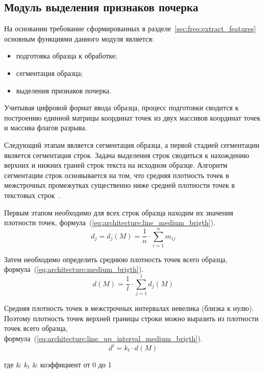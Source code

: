 \subsection{Модуль выделения признаков почерка}
На основании требование сформированных в разделе~\ref{sec:freq:extract_features} основным функциями данного модуля является:
\begin{itemize}
  \item подготовка образца к обработке;
  \item сегментация образца;
  \item выделения признаков почерка.
\end{itemize}

Учитывая цифровой формат ввода образца, процесс подготовки сводится к построению единной матрицы координат точек из двух массивов координат точек и массива флагов разрыва.

Следующий этапам является сегментация образца, а первой стадией сегментации является сегментация строк.
Задача выделения строк сводиться к нахождению верхних и нижних граней строк текста на исходном образце. Алгоритм сегментации строк основывается на том, что средняя плотность точек в межстрочных промежутках существенно ниже средней плотности точек в текстовых строк~\cite{cv_text_image_segmentator}.

Первым этапом необходимо для всех строк образца находим их значения плотности точек, формула~(\ref{eq:architecture:line_medium_brigth}).
\begin{equation}
  \label{eq:architecture:line_medium_brigth}
  d_j = d_j(M) = \frac{1}{n}\cdot\sum\limits_{i=1}^{n} m_{ij}
\end{equation}

Затем необходимо определить среднюю плотность точек всего образца, \mbox{формула~(\ref{eq:architecture:medium_brigth}).}
\begin{equation}
  \label{eq:architecture:medium_brigth}
  d(M) = \frac{1}{l}\cdot\sum\limits_{j=1}^{l} d_j(M)
\end{equation}

Средняя плотность точек в межстрочных интервалах невелика (близка к нулю). Поэтому плотность точек верхней границы строки можно выразить из плотности точек всего образца, формула~(\ref{eq:architecture:line_up_interval_medium_brigth}).
\begin{equation}
  \label{eq:architecture:line_up_interval_medium_brigth}
  d^{t} = k_{t} \cdot d(M)
\end{equation}
\begin{explanation}
где & $ k_{t} $ & коэффициент от 0 до 1
\end{explanation}

